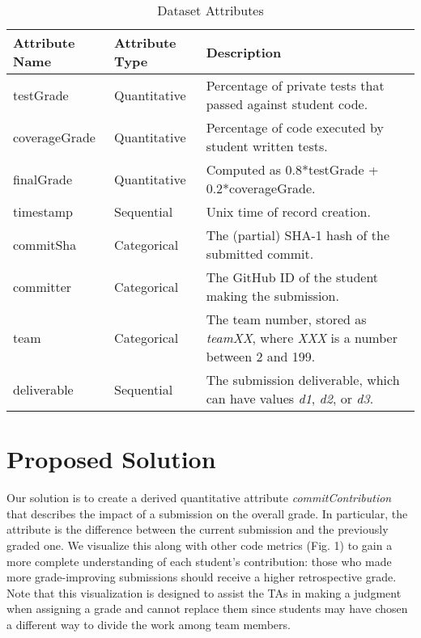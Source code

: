 \documentclass[preprint,journal]{vgtc}       %
\begin{document}
\begin{table*}[t]
  \caption{Dataset Attributes}
  \label{tab:attributes}
  \centering
  \begin{tabular*}{\textwidth}{lll}
    \hline
    \textbf{Attribute Name} & \textbf{Attribute Type} & \textbf{Description} \\
    \hline
    testGrade      & Quantitative & Percentage of private tests that passed against student code. \\
    coverageGrade  & Quantitative & Percentage of code executed by student written tests. \\
    finalGrade     & Quantitative & Computed as 0.8*testGrade + 0.2*coverageGrade. \\
    timestamp      & Sequential   & Unix time of record creation. \\
    commitSha      & Categorical  & The (partial) SHA-1 hash of the submitted commit. \\
    committer      & Categorical  & The GitHub ID of the student making the submission. \\
    team           & Categorical  & The team number, stored as \textit{teamXX}, where \textit{XXX} is a number between 2 and 199. \\
    deliverable    & Sequential   & The submission deliverable, which can have values \textit{d1}, \textit{d2}, or \textit{d3}. \\
    \hline
  \end{tabular*}
\end{table*}


\section{Proposed Solution}
Our solution is to create a derived quantitative attribute \textit{commitContribution} that describes
the impact of a submission on the overall grade. In particular, the attribute is
the difference between the current submission and the previously graded one. We
visualize this along with other code metrics (Fig. 1) to gain a more
complete understanding of each student's contribution: those who made more grade-improving
submissions should receive a higher retrospective grade. Note that this visualization
is designed to assist the TAs in
making a judgment when assigning a grade and cannot replace them since students may
have chosen a different way to divide the work among team members.
\end{document}
